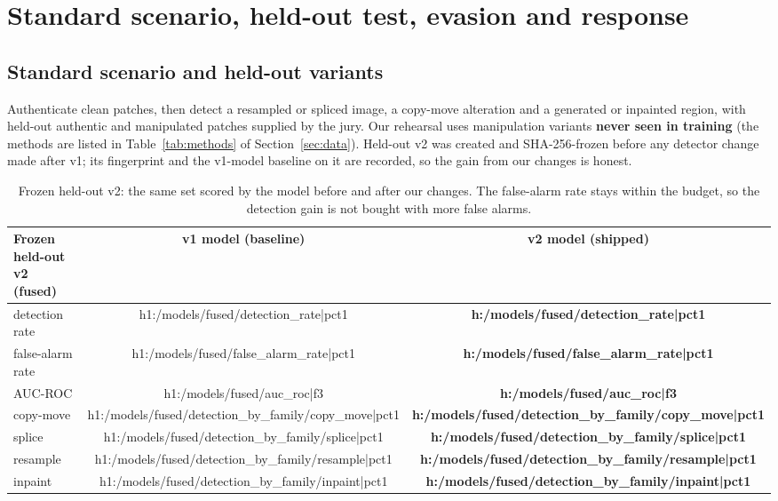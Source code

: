 \section{Standard scenario, held-out test, evasion and response}\label{sec:scenario}

\subsection{Standard scenario and held-out variants}
Authenticate clean patches, then detect a resampled or spliced image, a copy-move alteration and a generated or inpainted region, with held-out authentic and manipulated patches supplied by the jury. Our rehearsal uses manipulation variants \textbf{never seen in training} (the methods are listed in Table~\ref{tab:methods} of Section~\ref{sec:data}). Held-out v2 was created and SHA-256-frozen before any detector change made after v1; its fingerprint and the v1-model baseline on it are recorded, so the gain from our changes is honest.

\begin{table}[!htbp]
\centering\small
\begin{tabular}{|l|c|c|}
\hline
\textbf{Frozen held-out v2 (fused)} & \textbf{v1 model (baseline)} & \textbf{v2 model (shipped)}\\
\hline
detection rate & {{h1:/models/fused/detection_rate|pct1}} & \textbf{{{h:/models/fused/detection_rate|pct1}}}\\
\hline
false-alarm rate & {{h1:/models/fused/false_alarm_rate|pct1}} & \textbf{{{h:/models/fused/false_alarm_rate|pct1}}}\\
\hline
AUC-ROC & {{h1:/models/fused/auc_roc|f3}} & \textbf{{{h:/models/fused/auc_roc|f3}}}\\
\hline
copy-move & {{h1:/models/fused/detection_by_family/copy_move|pct1}} & \textbf{{{h:/models/fused/detection_by_family/copy_move|pct1}}}\\
\hline
splice & {{h1:/models/fused/detection_by_family/splice|pct1}} & \textbf{{{h:/models/fused/detection_by_family/splice|pct1}}}\\
\hline
resample & {{h1:/models/fused/detection_by_family/resample|pct1}} & \textbf{{{h:/models/fused/detection_by_family/resample|pct1}}}\\
\hline
inpaint & {{h1:/models/fused/detection_by_family/inpaint|pct1}} & \textbf{{{h:/models/fused/detection_by_family/inpaint|pct1}}}\\
\hline
\end{tabular}
\caption{Frozen held-out v2: the same set scored by the model before and after our changes. The false-alarm rate stays within the budget, so the detection gain is not bought with more false alarms.}
\end{table}

